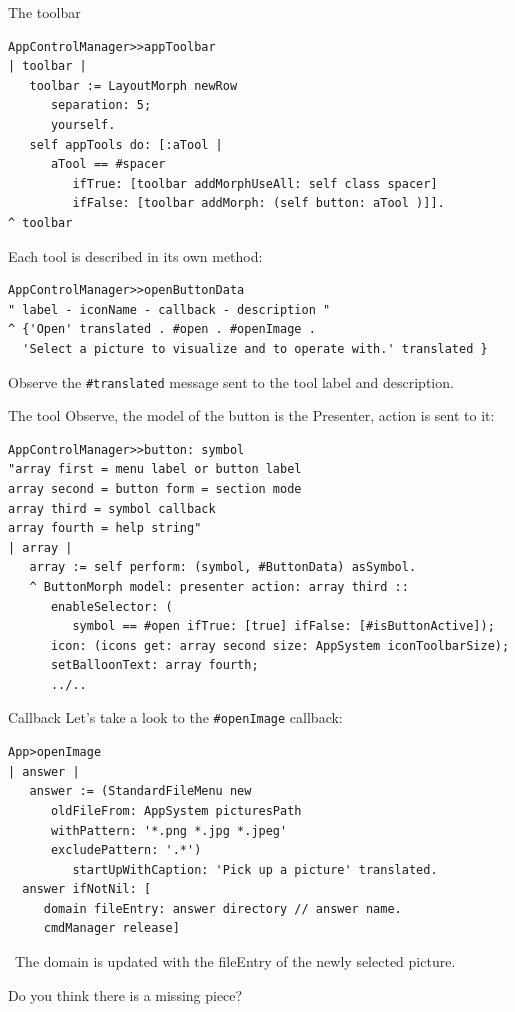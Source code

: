 \documentclass{beamer}
\newcommand{\tip}{\boldmath{\textcolor{red}{$\Rightarrow$}}}
\begin{document}
\begin{frame}[fragile]{The toolbar}
  \fontsize{10pt}{8pt}\selectfont
\begin{lstlisting}[language=Smalltalk]
AppControlManager>>appToolbar
| toolbar |
   toolbar := LayoutMorph newRow 
      separation: 5; 
      yourself.
   self appTools do: [:aTool | 
      aTool == #spacer 
         ifTrue: [toolbar addMorphUseAll: self class spacer]
         ifFalse: [toolbar addMorph: (self button: aTool )]].
^ toolbar    
  \end{lstlisting}

Each tool is described in its own method:
\fontsize{9pt}{8pt}\selectfont
\begin{lstlisting}[language=Smalltalk]
AppControlManager>>openButtonData
" label - iconName - callback - description "
^ {'Open' translated . #open . #openImage .
  'Select a picture to visualize and to operate with.' translated }
\end{lstlisting}

Observe the \texttt{\#translated} message sent to the tool label and
description.
\end{frame}
\begin{frame}[fragile]{The tool}
Observe, the model of the button is the Presenter, action is sent to it:
 \fontsize{9pt}{8pt}\selectfont
  \begin{lstlisting}[language=Smalltalk]
AppControlManager>>button: symbol
"array first = menu label or button label
array second = button form = section mode
array third = symbol callback
array fourth = help string"	
| array |
   array := self perform: (symbol, #ButtonData) asSymbol.
   ^ ButtonMorph model: presenter action: array third ::
      enableSelector: (
         symbol == #open ifTrue: [true] ifFalse: [#isButtonActive]);
      icon: (icons get: array second size: AppSystem iconToolbarSize);
      setBalloonText: array fourth;
      ../..
  \end{lstlisting}  
\end{frame}

\begin{frame}[fragile]{Callback}
  Let's take a look to the \texttt{\#openImage} callback:
 \fontsize{9pt}{8pt}\selectfont
  \begin{lstlisting}[language=Smalltalk]
App>openImage
| answer |
   answer := (StandardFileMenu new
      oldFileFrom: AppSystem picturesPath
      withPattern: '*.png *.jpg *.jpeg'
      excludePattern: '.*')
         startUpWithCaption: 'Pick up a picture' translated.
  answer ifNotNil: [
     domain fileEntry: answer directory // answer name.
     cmdManager release]
 \end{lstlisting}
 \fontsize{11pt}{8pt}\selectfont

 \tip\ The domain is updated with the fileEntry of the newly selected
 picture.
 
 Do you think there is a missing piece?
\end{frame}
\end{document}
